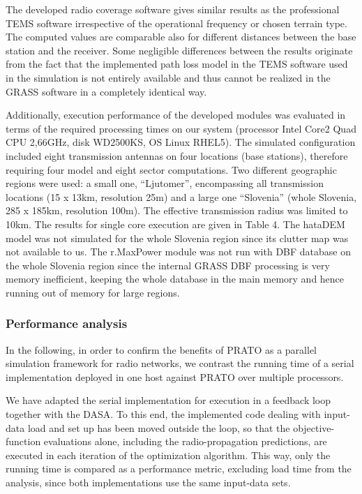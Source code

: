 The developed radio coverage software gives similar results as the
professional TEMS software irrespective of the operational frequency
or chosen terrain type. The computed values are comparable also for
different distances between the base station and the receiver. Some
negligible differences between the results originate from the fact
that the implemented path loss model in the TEMS software used in
the simulation is not entirely available and thus cannot be realized
in the GRASS software in a completely identical way.

Additionally, execution performance of the developed modules was evaluated
in terms of the required processing times on our system (processor
Intel Core2 Quad CPU 2,66GHz, disk WD2500KS, OS Linux RHEL5). The
simulated configuration included eight transmission antennas on four
locations (base stations), therefore requiring four model and eight
sector computations. Two different geographic regions were used: a
small one, \textquotedblleft{}Ljutomer\textquotedblright{}, encompassing
all transmission locations (15 x 13km, resolution 25m) and a large
one \textquotedblleft{}Slovenia\textquotedblright{} (whole Slovenia,
285 x 185km, resolution 100m). The effective transmission radius was
limited to 10km. The results for single core execution are given in
Table 4. The hataDEM model was not simulated for the whole Slovenia
region since its clutter map was not available to us. The r.MaxPower
module was not run with DBF database on the whole Slovenia region
since the internal GRASS DBF processing is very memory inefficient,
keeping the whole database in the main memory and hence running out
of memory for large regions.


\subsubsection{Performance analysis}

In the following, in order to confirm the benefits of PRATO as a parallel
simulation framework for radio networks, we contrast the running time
of a serial implementation deployed in one host against PRATO over
multiple processors.

We have adapted the serial implementation for execution in a feedback
loop together with the DASA. To this end, the implemented code dealing
with input-data load and set up has been moved outside the loop, so
that the objective-function evaluations alone, including the radio-propagation
predictions, are executed in each iteration of the optimization algorithm.
This way, only the running time is compared as a performance metric,
excluding load time from the analysis, since both implementations
use the same input-data sets.

